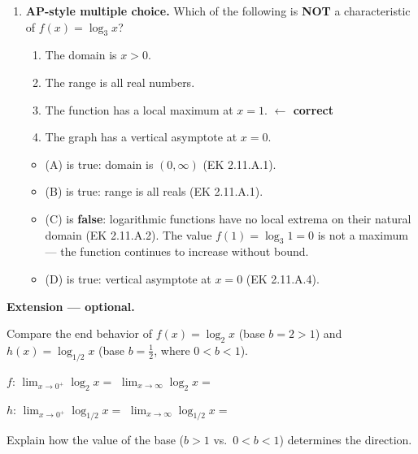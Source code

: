\documentclass[10pt]{article}
\begin{document}
\begin{enumerate}[leftmargin=1.8em, itemsep=14pt]
\item \textbf{AP-style multiple choice.} Which of the following is \textbf{NOT} a
      characteristic of $f(x) = \log_3 x$?

\vspace{6pt}
\begin{enumerate}[leftmargin=2em, itemsep=4pt, label=(\Alph*)]
  \item The domain is $x > 0$.
  \item The range is all real numbers.
  \item The function has a local maximum at $x = 1$. \textcolor{keyred}{\textbf{$\leftarrow$ correct}}
  \item The graph has a vertical asymptote at $x = 0$.
\end{enumerate}

\begin{itemize}[leftmargin=1.5em, itemsep=2pt, topsep=4pt]
  \item (A) is true: domain is $(0,\infty)$ (EK 2.11.A.1).
  \item (B) is true: range is all reals (EK 2.11.A.1).
  \item (C) is \textbf{false}: logarithmic functions have no local extrema on their natural
        domain (EK 2.11.A.2). The value $f(1) = \log_3 1 = 0$ is not a maximum --- the function
        continues to increase without bound.
  \item (D) is true: vertical asymptote at $x = 0$ (EK 2.11.A.4).
\end{itemize}

\end{enumerate}

\vspace{0.12in}

\begin{extensionbox}
\textbf{Extension --- optional.}

Compare the end behavior of $f(x) = \log_2 x$ (base $b = 2 > 1$) and $h(x) = \log_{1/2} x$
(base $b = \tfrac{1}{2}$, where $0 < b < 1$).

\vspace{6pt}
$f$: \quad $\displaystyle\lim_{x \to 0^+}\log_2 x = $ \ans{$-\infty$} \quad
$\displaystyle\lim_{x \to \infty}\log_2 x = $ \ans{$+\infty$}

\vspace{6pt}
$h$: \quad $\displaystyle\lim_{x \to 0^+}\log_{1/2} x = $ \ans{$+\infty$} \quad
$\displaystyle\lim_{x \to \infty}\log_{1/2} x = $ \ans{$-\infty$}

\vspace{6pt}
Explain how the value of the base ($b > 1$ vs.\ $0 < b < 1$) determines the direction.

\end{extensionbox}
\end{document}
